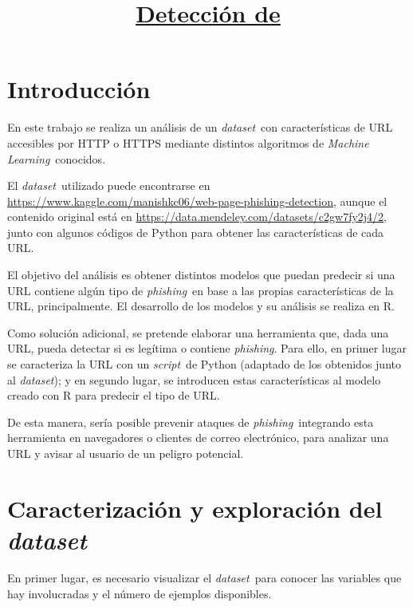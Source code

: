 \documentclass[12pt, a4paper]{article}
\title{\underline{\textbf{Detección de \phishing}}}
\author{\Author}
\date{\displaydate{date}}
\renewcommand{\textit}{\textsl}
\newcommand*{\dataset}{\textit{dataset}}
\newcommand*{\ML}{\textit{Machine Learning}}
\newcommand*{\phishing}{\textit{phishing}}
\newcommand*{\script}{\textit{script}}
\begin{document}
  \vspace{3cm}
  \maketitle

  \newpage
  \tableofcontents

  \newpage
  \listoffigures

  \newpage
  \section*{Introducción}

    En este trabajo se realiza un análisis de un \dataset\ con características de URL accesibles por HTTP o HTTPS mediante distintos algoritmos de \ML\ conocidos.

    El \dataset\ utilizado puede encontrarse en \url{https://www.kaggle.com/manishkc06/web-page-phishing-detection}, aunque el contenido original está en \url{https://data.mendeley.com/datasets/c2gw7fy2j4/2}, junto con algunos códigos de Python para obtener las características de cada URL.

    El objetivo del análisis es obtener distintos modelos que puedan predecir si una URL contiene algún tipo de \phishing\ en base a las propias características de la URL, principalmente. El desarrollo de los modelos y su análisis se realiza en R.

    Como solución adicional, se pretende elaborar una herramienta que, dada una URL, pueda detectar si es legítima o contiene \phishing. Para ello, en primer lugar se caracteriza la URL con un \script\ de Python (adaptado de los obtenidos junto al \dataset); y en segundo lugar, se introducen estas características al modelo creado con R para predecir el tipo de URL.

    De esta manera, sería posible prevenir ataques de \phishing\ integrando esta herramienta en navegadores o clientes de correo electrónico, para analizar una URL y avisar al usuario de un peligro potencial.

  \section{Caracterización y exploración del \dataset}

    En primer lugar, es necesario visualizar el \dataset\ para conocer las variables que hay involucradas y el número de ejemplos disponibles.
\end{document}
